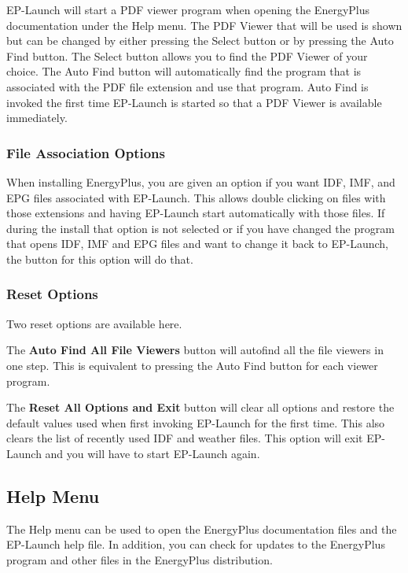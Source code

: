 EP-Launch will start a PDF viewer program when opening the EnergyPlus documentation under the Help menu. The PDF Viewer that will be used is shown but can be changed by either pressing the Select button or by pressing the Auto Find button. The Select button allows you to find the PDF Viewer of your choice. The Auto Find button will automatically find the program that is associated with the PDF file extension and use that program. Auto Find is invoked the first time EP-Launch is started so that a PDF Viewer is available immediately.

\subsubsection{File Association Options}\label{file-association-options}

When installing EnergyPlus, you are given an option if you want IDF, IMF, and EPG files associated with EP-Launch. This allows double clicking on files with those extensions and having EP-Launch start automatically with those files. If during the install that option is not selected or if you have changed the program that opens IDF, IMF and EPG files and want to change it back to EP-Launch, the button for this option will do that.

\subsubsection{Reset Options}\label{reset-options}

Two reset options are available here.

The \textbf{Auto Find All File Viewers} button will autofind all the file viewers in one step. This is equivalent to pressing the Auto Find button for each viewer program.

The \textbf{Reset All Options and Exit} button will clear all options and restore the default values used when first invoking EP-Launch for the first time. This also clears the list of recently used IDF and weather files. This option will exit EP-Launch and you will have to start EP-Launch again.

\subsection{Help Menu}\label{help-menu}

The Help menu can be used to open the EnergyPlus documentation files and the EP-Launch help file. In addition, you can check for updates to the EnergyPlus program and other files in the EnergyPlus distribution.

